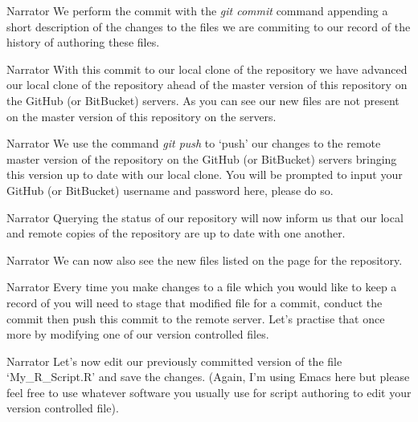\documentclass{screenplay} %
\begin{document}
\begin{dialogue}{Narrator}
We perform the commit with the \textit{git commit} command appending a short description of the changes to the files we are commiting to our record of the history of authoring these files.
\end{dialogue}

\begin{dialogue}{Narrator}
With this commit to our local clone of the repository we have advanced our local clone of the repository ahead of the master version of this repository on the GitHub (or BitBucket) servers. As you can see our new files are not present on the master version of this repository on the servers.
\end{dialogue}

\begin{dialogue}{Narrator}
We use the command \textit{git push} to `push' our changes to the remote master version of the repository on the GitHub (or BitBucket) servers bringing this version up to date with our local clone.  You will be prompted to input your GitHub (or BitBucket) username and password here, please do so.
\end{dialogue}

\begin{dialogue}{Narrator}
Querying the status of our repository will now inform us that our local and remote copies of the repository are up to date with one another.
\end{dialogue}

\begin{dialogue}{Narrator}
We can now also see the new files listed on the page for the repository.
\end{dialogue}

\begin{dialogue}[]{Narrator}
Every time you make changes to a file which you would like to keep a record of you will need to stage that modified file for a commit, conduct the commit then push this commit to the remote server.  Let's practise that once more by modifying one of our version controlled files.
\end{dialogue}

\begin{dialogue}{Narrator}
Let's now edit our previously committed version of the file `My\_R\_Script.R' and save the changes. (Again, I'm using Emacs here but please feel free to use whatever software you usually use for script authoring to edit your version controlled file).
\end{dialogue}
\end{document}
